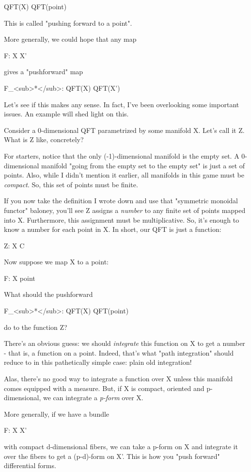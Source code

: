 QFT(X) \to  QFT(point)

This is called "pushing forward to a point".  

More generally, we could hope that any map 

F: X \to  X'

gives a "pushforward" map

F_{<sub>*}</sub>: QFT(X) \to  QFT(X')

Let's see if this makes any sense.   In fact, I've been 
overlooking some important issues.  An example will shed light 
on this.  

Consider a 0-dimensional QFT parametrized by some manifold X.  
Let's call it Z.  What is Z like, concretely?

For starters, notice that the only (-1)-dimensional manifold
is the empty set.  A 0-dimensional manifold "going from the 
empty set to the empty set" is just a set of points.  Also, 
while I didn't mention it earlier, all manifolds in this game
must be \emph{compact}.  So, this set of points must be finite.

If you now take the definition I wrote down and use that
"symmetric monoidal functor" baloney, you'll see Z assigns a 
\emph{number} to any finite set of points mapped into X.  Furthermore, 
this assignment must be multiplicative.  So, it's enough to know 
a number for each point in X.   In short, our QFT is just a 
function:

Z: X \to  C

Now suppose we map X to a point:

F: X \to  point

What should the pushforward 

F_{<sub>*}</sub>: QFT(X) \to  QFT(point)

do to the function Z?

There's an obvious guess: we should \emph{integrate} this function 
on X to get a number - that is, a function on a point.  Indeed, 
that's what "path integration" should reduce to in this 
pathetically simple case: plain old integration!

Alas, there's no good way to integrate a function over X unless 
this manifold comes equipped with a measure.  But, if X is 
compact, oriented and p-dimensional, we can integrate a \emph{p-form}
over X. 

More generally, if we have a bundle

F: X \to  X' 

with compact d-dimensional fibers, we can take a p-form on X
and integrate it over the fibers to get a (p-d)-form on X'.
This is how you "push forward" differential forms.  

